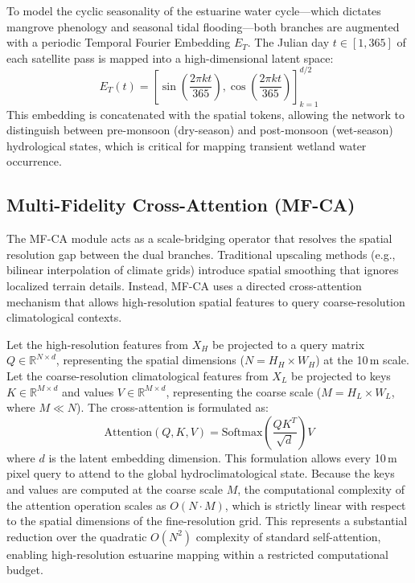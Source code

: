 \documentclass[journal]{IEEEtran}
\begin{document}
To model the cyclic seasonality of the estuarine water cycle---which dictates mangrove phenology and seasonal tidal flooding---both branches are augmented with a periodic Temporal Fourier Embedding $E_T$. The Julian day $t \in [1, 365]$ of each satellite pass is mapped into a high-dimensional latent space:
\begin{equation}
E_T(t) = \left[ \sin\left(\frac{2\pi k t}{365}\right), \cos\left(\frac{2\pi k t}{365}\right) \right]_{k=1}^{d/2}
\end{equation}
This embedding is concatenated with the spatial tokens, allowing the network to distinguish between pre-monsoon (dry-season) and post-monsoon (wet-season) hydrological states, which is critical for mapping transient wetland water occurrence.

\subsection{Multi-Fidelity Cross-Attention (MF-CA)}
The MF-CA module acts as a scale-bridging operator that resolves the spatial resolution gap between the dual branches. Traditional upscaling methods (e.g., bilinear interpolation of climate grids) introduce spatial smoothing that ignores localized terrain details. Instead, MF-CA uses a directed cross-attention mechanism that allows high-resolution spatial features to query coarse-resolution climatological contexts.

Let the high-resolution features from $X_H$ be projected to a query matrix $Q \in \mathbb{R}^{N \times d}$, representing the spatial dimensions ($N = H_H \times W_H$) at the 10\,m scale. Let the coarse-resolution climatological features from $X_L$ be projected to keys $K \in \mathbb{R}^{M \times d}$ and values $V \in \mathbb{R}^{M \times d}$, representing the coarse scale ($M = H_L \times W_L$, where $M \ll N$). The cross-attention is formulated as:
\begin{equation}
\text{Attention}(Q, K, V) = \text{Softmax}\left(\frac{QK^T}{\sqrt{d}}\right)V
\end{equation}
where $d$ is the latent embedding dimension. This formulation allows every 10\,m pixel query to attend to the global hydroclimatological state. Because the keys and values are computed at the coarse scale $M$, the computational complexity of the attention operation scales as $O(N \cdot M)$, which is strictly linear with respect to the spatial dimensions of the fine-resolution grid. This represents a substantial reduction over the quadratic $O(N^2)$ complexity of standard self-attention, enabling high-resolution estuarine mapping within a restricted computational budget.
\end{document}
